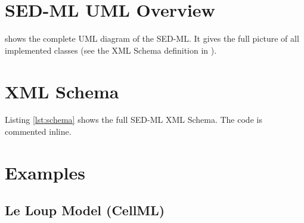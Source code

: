 \documentclass[11pt]{article}
\begin{document}
\begin{appendix}

\section{SED-ML UML Overview}
\label{app:uml}
 shows the complete UML diagram of the SED-ML. It gives the full picture of all implemented classes (see the XML Schema definition in \pageref{lst:schema}).
%
  

\section{XML Schema}
\label{sec:xmlschema}
Listing \ref{lst:schema} shows the full SED-ML XML Schema. The code is commented inline.


\section{Examples}

\subsection{Le Loup Model (CellML)}


\end{appendix}



\end{document}
